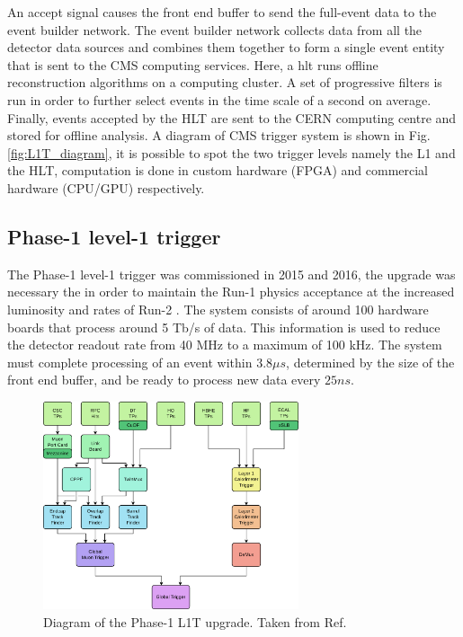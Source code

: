 \documentclass[../../main.tex]{subfiles}
\begin{document}
An accept signal causes the front end buffer to send the full-event data to the event builder network. The event builder network collects data from all the detector data sources and combines them together to form a single event entity that is sent to the CMS computing services. Here, a \acrfull{hlt} runs offline reconstruction algorithms on a computing cluster. A set of
progressive filters is run in order to further select events in the time scale of a second on average.
Finally, events accepted by the HLT are sent to the CERN computing centre and stored for offline analysis. A diagram of CMS trigger system is shown in Fig. \ref{fig:L1T_diagram}, it is possible to spot the two trigger levels namely the L1 and the HLT, computation is done in custom hardware (FPGA) and commercial hardware (CPU/GPU) respectively.

\subsection{Phase-1 level-1 trigger}
\label{Phase-1_l1T}

The Phase-1 level-1 trigger was commissioned in 2015 and 2016, the upgrade was necessary the in order to maintain the Run-1 physics acceptance at the increased luminosity and rates of
Run-2 \cite{L1T-1up}. The system consists of around 100 hardware boards that process around 5 Tb/s of data. This information is used to reduce the detector readout rate from 40 MHz to a maximum of
100 kHz. The system must complete processing of an event within $3.8 \mu s$, determined by the size of the front end buffer, and be ready to process new data every $25 ns$.


\begin{figure}[h]
    \centering
    \includegraphics[width=0.67\textwidth]{sections/02/Images/Phase-1_l1t.pdf}
    \caption{Diagram of the Phase-1 L1T upgrade. Taken from Ref. \cite{L1T-1up}}
    \label{fig:Phase-1_L1T}
\end{figure}
\end{document}
